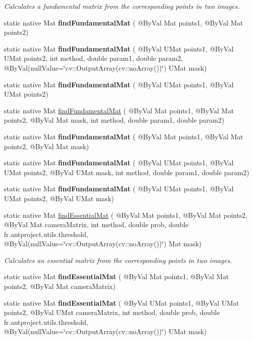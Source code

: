 \begin{DoxyCompactItemize}
\begin{DoxyCompactList}\small\item\em Calculates a fundamental matrix from the corresponding points in two images. \end{DoxyCompactList}\item 
static native Mat {\bfseries find\+Fundamental\+Mat} ( @By\+Val Mat points1, @By\+Val Mat points2)
\item 
static native Mat {\bfseries find\+Fundamental\+Mat} ( @By\+Val U\+Mat points1, @By\+Val U\+Mat points2, int method, double param1, double param2, @By\+Val(null\+Value=\char`\"{}cv\+::\+Output\+Array(cv\+::no\+Array())\char`\"{}) U\+Mat mask)
\item 
static native Mat {\bfseries find\+Fundamental\+Mat} ( @By\+Val U\+Mat points1, @By\+Val U\+Mat points2)
\item 
static native Mat \hyperlink{group__calib3d_ga1a8446757231db93d44c99331ac4747d}{find\+Fundamental\+Mat} ( @By\+Val Mat points1, @By\+Val Mat points2, @By\+Val Mat mask, int method, double param1, double param2)
\item 
static native Mat {\bfseries find\+Fundamental\+Mat} ( @By\+Val Mat points1, @By\+Val Mat points2, @By\+Val Mat mask)
\item 
static native Mat {\bfseries find\+Fundamental\+Mat} ( @By\+Val U\+Mat points1, @By\+Val U\+Mat points2, @By\+Val U\+Mat mask, int method, double param1, double param2)
\item 
static native Mat {\bfseries find\+Fundamental\+Mat} ( @By\+Val U\+Mat points1, @By\+Val U\+Mat points2, @By\+Val U\+Mat mask)
\item 
static native Mat \hyperlink{group__calib3d_gad86954f592d1f99b0f8cdec7f4134c7a}{find\+Essential\+Mat} ( @By\+Val Mat points1, @By\+Val Mat points2, @By\+Val Mat camera\+Matrix, int method, double prob, double fr.antproject.utils.threshold, @By\+Val(null\+Value=\char`\"{}cv\+::\+Output\+Array(cv\+::no\+Array())\char`\"{}) Mat mask)
\begin{DoxyCompactList}\small\item\em Calculates an essential matrix from the corresponding points in two images. \end{DoxyCompactList}\item 
static native Mat {\bfseries find\+Essential\+Mat} ( @By\+Val Mat points1, @By\+Val Mat points2, @By\+Val Mat camera\+Matrix)
\item 
static native Mat {\bfseries find\+Essential\+Mat} ( @By\+Val U\+Mat points1, @By\+Val U\+Mat points2, @By\+Val U\+Mat camera\+Matrix, int method, double prob, double fr.antproject.utils.threshold, @By\+Val(null\+Value=\char`\"{}cv\+::\+Output\+Array(cv\+::no\+Array())\char`\"{}) U\+Mat mask)

\end{DoxyCompactItemize}
